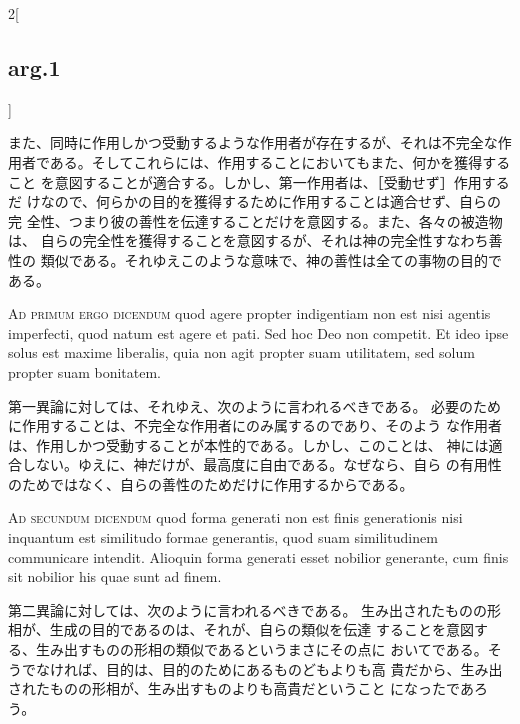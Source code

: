 \documentclass[paper=a4paper,fontsize=10pt,jafontsize=9pt,titlepage]{jlreq}
\begin{document}
\begin{paracol}{2}[\subsection{arg.1}]
\switchcolumn

また、同時に作用しかつ受動するような作用者が存在するが、それは不完全な作
用者である。そしてこれらには、作用することにおいてもまた、何かを獲得すること
 を意図することが適合する。しかし、第一作用者は、［受動せず］作用するだ
 けなので、何らかの目的を獲得するために作用することは適合せず、自らの完
 全性、つまり彼の善性を伝達することだけを意図する。また、各々の被造物は、
 自らの完全性を獲得することを意図するが、それは神の完全性すなわち善性の
 類似である。それゆえこのような意味で、神の善性は全ての事物の目的である。

\switchcolumn*[\subsection{ad.1}]

{\scshape Ad primum ergo dicendum} quod agere propter
indigentiam non est nisi agentis imperfecti, quod natum est agere et
pati. Sed hoc Deo non competit. Et ideo ipse solus est maxime liberalis,
quia non agit propter suam utilitatem, sed solum propter suam bonitatem.

\switchcolumn

第一異論に対しては、それゆえ、次のように言われるべきである。
必要のために作用することは、不完全な作用者にのみ属するのであり、そのよう
 な作用者は、作用しかつ受動することが本性的である。しかし、このことは、
 神には適合しない。ゆえに、神だけが、最高度に自由である。なぜなら、自ら
 の有用性のためではなく、自らの善性のためだけに作用するからである。

\switchcolumn*[\subsection{ad.2}]

{\scshape Ad secundum dicendum} quod forma generati non
est finis generationis nisi inquantum est similitudo formae generantis,
quod suam similitudinem communicare intendit. Alioquin forma generati
esset nobilior generante, cum finis sit nobilior his quae sunt ad finem.

\switchcolumn

第二異論に対しては、次のように言われるべきである。
生み出されたものの形相が、生成の目的であるのは、それが、自らの類似を伝達
 することを意図する、生み出すものの形相の類似であるというまさにその点に
 おいてである。そうでなければ、目的は、目的のためにあるものどもよりも高
 貴だから、生み出されたものの形相が、生み出すものよりも高貴だということ
 になったであろう。


\end{paracol}
\end{document}
